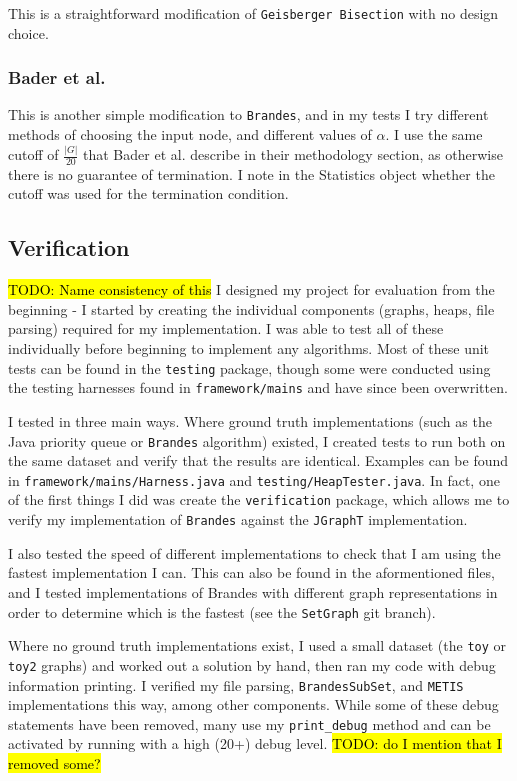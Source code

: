 \documentclass[12pt,a4paper,twoside,openright]{report}
\newcommand{\todo}[1]{\hl{TODO: #1}}
\newcommand{\ttt}[1]{\texttt{#1}}
\begin{document}
					This is a straightforward modification of  \ttt{Geisberger Bisection} with no design choice.
					
			\subsubsection{Bader et al.}
				This is another simple modification to \ttt{Brandes}, and in my tests I try different methods of choosing the input node, and different values of $\alpha$. I use the same cutoff of $\frac{|G|}{20}$ that Bader et al. describe in their methodology section, as otherwise there is no guarantee of termination. I note in the Statistics object whether the cutoff was used for the termination condition.
								
			
		\subsection{Verification} \todo{Name consistency of this}
		I designed my project for evaluation from the beginning - I started by creating the individual components (graphs, heaps, file parsing) required for my implementation. I was able to test all of these individually before beginning to implement any algorithms. Most of these unit tests can be found in the \ttt{testing} package, though some were conducted using the testing harnesses found in \ttt{framework/mains} and have since been overwritten.
		
		I tested in three main ways. Where ground truth implementations (such as the Java priority queue or \ttt{Brandes} algorithm) existed, I created tests to run both on the same dataset and verify that the results are identical. Examples can be found in \ttt{framework/mains/Harness.java} and \ttt{testing/HeapTester.java}. In fact, one of the first things I did was create the \ttt{verification} package, which allows me to verify my implementation of \ttt{Brandes} against the \ttt{JGraphT} implementation.
		
		I also tested the speed of different implementations to check that I am using the fastest implementation I can. This can also be found in the aformentioned files, and I tested implementations of Brandes with different graph representations in order to determine which is the fastest (see the \ttt{SetGraph} git branch).
		
		Where no ground truth implementations exist, I used a small dataset (the \ttt{toy} or \ttt{toy2} graphs) and worked out a solution by hand, then ran my code with debug information printing. I verified my file parsing, \ttt{BrandesSubSet}, and \ttt{METIS} implementations this way, among other components. While some of these debug statements have been removed, many use my \ttt{print\_debug} method and can be activated by running with a high (20+) debug level. \todo{do I mention that I removed some?}
		
\end{document}
